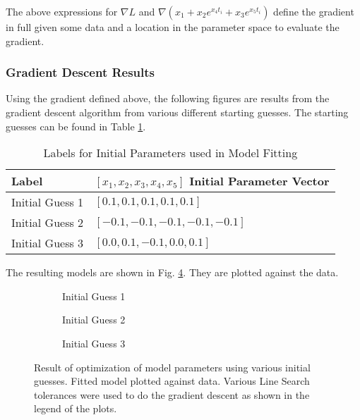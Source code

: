 \documentclass{article}
\begin{document}
    The above expressions for $\nabla L$ and $\nabla (x_1 + x_2 e ^ {x_4 t_i} + x_3 e ^{x_5 t_i})$ define the gradient in full given some data and a location in the parameter space to evaluate the gradient.

    \subsubsection{Gradient Descent Results}

    Using the gradient defined above, the following figures are results from the gradient descent algorithm from various different starting guesses. The starting guesses can be found in Table \ref{tab:Q3_InitialGuessParams}.

    \begin{table}[]
        \centering
        \begin{tabular}{|l|l|}
        \hline
        \textbf{Label}  & \textbf{$\left[ x_1, x_2, x_3, x_4, x_5 \right]$ Initial Parameter Vector} \\ \hline
        Initial Guess 1 &  $[0.1, 0.1, 0.1, 0.1, 0.1]$                                                 \\ \hline
        Initial Guess 2 &  $[-0.1, -0.1, -0.1, -0.1, -0.1]$                                            \\ \hline
        Initial Guess 3 &  $[0.0, 0.1, -0.1, 0.0, 0.1]$                                                \\ \hline
        \end{tabular}
        \caption{Labels for Initial Parameters used in Model Fitting}
        \label{tab:Q3_InitialGuessParams}
    \end{table}

    The resulting models are shown in Fig. \ref{fig:Q3_best_fit_all}. They are plotted against the data.

    \begin{figure}[H]
        \centering
        \begin{subfigure}{.6\textwidth}
            \centering
            
            \caption{Initial Guess 1}
            \label{fig:Q3_best_fit_1}
        \end{subfigure}
        \begin{subfigure}{.6\textwidth}
            \centering
            
            \caption{Initial Guess 2}
            \label{fig:Q3_best_fit_2}
        \end{subfigure}
        \begin{subfigure}{.6\textwidth}
            \centering
            
            \caption{Initial Guess 3}
            \label{fig:Q3_best_fit_3}
        \end{subfigure}
        \caption{Result of optimization of model parameters using various initial guesses. Fitted model plotted against data. Various Line Search tolerances were used to do the gradient descent as shown in the legend of the plots.}
        \label{fig:Q3_best_fit_all}
    \end{figure}
\end{document}
